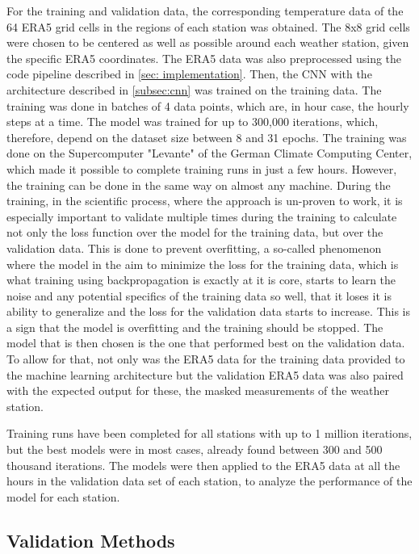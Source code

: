 For the training and validation data, the corresponding temperature data of the 64 ERA5 grid cells in the regions of each station was obtained.
The 8x8 grid cells were chosen to be centered as well as possible around each weather station, given the specific ERA5 coordinates.
The ERA5 data was also preprocessed using the code pipeline described in \autoref{sec: implementation}.
Then, the CNN with the architecture described in \autoref{subsec:cnn} was trained on the training data. The training was done in batches of 4 data points, which are, in hour case, the hourly steps at a time. The model was trained for up to 300,000 iterations, which, therefore, depend on the dataset size between 8 and 31 epochs. The training was done on the Supercomputer "Levante" of the German Climate Computing Center, which made it possible to complete training runs in just a few hours. However, the training can be done in the same way on almost any machine. During the training, in the scientific process, where the approach is un-proven to work, it is especially important to validate multiple times during the training to calculate not only the loss function over the model for the training data, but over the validation data. This is done to prevent overfitting, a so-called phenomenon where the model in the aim to minimize the loss for the training data, which is what training using backpropagation is exactly at it is core, starts to learn the noise and any potential specifics of the training data so well, that it loses it is ability to generalize and the loss for the validation data starts to increase. This is a sign that the model is overfitting and the training should be stopped. The model that is then chosen is the one that performed best on the validation data. To allow for that, not only was the ERA5 data for the training data provided to the machine learning architecture but the validation ERA5 data was also paired with the expected output for these, the masked measurements of the weather station.

Training runs have been completed for all stations with up to 1 million iterations, but the best models were in most cases, already found between 300 and 500 thousand iterations. The models were then applied to the ERA5 data at all the hours in the validation data set of each station, to analyze the performance of the model for each station. 

\subsection{Validation Methods}

